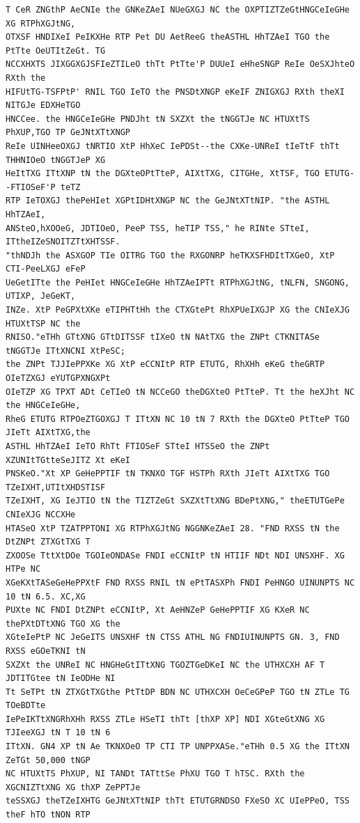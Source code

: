 \documentclass[11pt,a4paper]{article}
\begin{document}
\begin{lstlisting}[style=ciphertext,caption={Complete text after iteration 2}]
T CeR ZNGthP AeCNIe the GNKeZAeI NUeGXGJ NC the OXPTIZTZeGtHNGCeIeGHe XG RTPhXGJtNG,
OTXSF HNDIXeI PeIKXHe RTP Pet DU AetReeG theASTHL HhTZAeI TGO the PtTte OeUTItZeGt. TG
NCCXHXTS JIXGGXGJSFIeZTILeO thTt PtTte'P DUUeI eHheSNGP ReIe OeSXJhteO RXth the
HIFUtTG-TSFPtP' RNIL TGO IeTO the PNSDtXNGP eKeIF ZNIGXGJ RXth theXI NITGJe EDXHeTGO
HNCCee. the HNGCeIeGHe PNDJht tN SXZXt the tNGGTJe NC HTUXtTS PhXUP,TGO TP GeJNtXTtXNGP
ReIe UINHeeOXGJ tNRTIO XtP HhXeC IePDSt--the CXKe-UNReI tIeTtF thTt THHNIOeO tNGGTJeP XG
HeItTXG ITtXNP tN the DGXteOPtTteP, AIXtTXG, CITGHe, XtTSF, TGO ETUTG--FTIOSeF'P teTZ
RTP IeTOXGJ thePeHIet XGPtIDHtXNGP NC the GeJNtXTtNIP. "the ASTHL HhTZAeI,
ANSteO,hXOOeG, JDTIOeO, PeeP TSS, heTIP TSS," he RINte STteI, ITtheIZeSNOITZTtXHTSSF.
"thNDJh the ASXGOP TIe OITRG TGO the RXGONRP heTKXSFHDItTXGeO, XtP CTI-PeeLXGJ eFeP
UeGetITte the PeHIet HNGCeIeGHe HhTZAeIPTt RTPhXGJtNG, tNLFN, SNGONG, UTIXP, JeGeKT,
INZe. XtP PeGPXtXKe eTIPHTtHh the CTXGtePt RhXPUeIXGJP XG the CNIeXJG HTUXtTSP NC the
RNISO."eTHh GTtXNG GTtDITSSF tIXeO tN NAtTXG the ZNPt CTKNITASe tNGGTJe ITtXNCNI XtPeSC;
the ZNPt TJJIePPXKe XG XtP eCCNItP RTP ETUTG, RhXHh eKeG theGRTP OIeTZXGJ eYUTGPXNGXPt
OIeTZP XG TPXT ADt CeTIeO tN NCCeGO theDGXteO PtTteP. Tt the heXJht NC the HNGCeIeGHe,
RheG ETUTG RTPOeZTGOXGJ T ITtXN NC 10 tN 7 RXth the DGXteO PtTteP TGO JIeTt AIXtTXG,the
ASTHL HhTZAeI IeTO RhTt FTIOSeF STteI HTSSeO the ZNPt XZUNItTGtteSeJITZ Xt eKeI
PNSKeO."Xt XP GeHePPTIF tN TKNXO TGF HSTPh RXth JIeTt AIXtTXG TGO TZeIXHT,UTItXHDSTISF
TZeIXHT, XG IeJTIO tN the TIZTZeGt SXZXtTtXNG BDePtXNG," theETUTGePe CNIeXJG NCCXHe
HTASeO XtP TZATPPTONI XG RTPhXGJtNG NGGNKeZAeI 28. "FND RXSS tN the DtZNPt ZTXGtTXG T
ZXOOSe TttXtDOe TGOIeONDASe FNDI eCCNItP tN HTIIF NDt NDI UNSXHF. XG HTPe NC
XGeKXtTASeGeHePPXtF FND RXSS RNIL tN ePtTASXPh FNDI PeHNGO UINUNPTS NC 10 tN 6.5. XC,XG
PUXte NC FNDI DtZNPt eCCNItP, Xt AeHNZeP GeHePPTIF XG KXeR NC thePXtDTtXNG TGO XG the
XGteIePtP NC JeGeITS UNSXHF tN CTSS ATHL NG FNDIUINUNPTS GN. 3, FND RXSS eGOeTKNI tN
SXZXt the UNReI NC HNGHeGtITtXNG TGOZTGeDKeI NC the UTHXCXH AF T JDTITGtee tN IeODHe NI
Tt SeTPt tN ZTXGtTXGthe PtTtDP BDN NC UTHXCXH OeCeGPeP TGO tN ZTLe TG TOeBDTte
IePeIKTtXNGRhXHh RXSS ZTLe HSeTI thTt [thXP XP] NDI XGteGtXNG XG TJIeeXGJ tN T 10 tN 6
ITtXN. GN4 XP tN Ae TKNXOeO TP CTI TP UNPPXASe."eTHh 0.5 XG the ITtXN ZeTGt 50,000 tNGP
NC HTUXtTS PhXUP, NI TANDt TATttSe PhXU TGO T hTSC. RXth the XGCNIZTtXNG XG thXP ZePPTJe
teSSXGJ theTZeIXHTG GeJNtXTtNIP thTt ETUTGRNDSO FXeSO XC UIePPeO, TSS theF hTO tNON RTP

\end{lstlisting}
\end{document}
